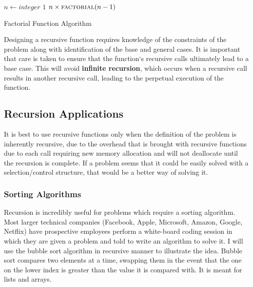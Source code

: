 \documentclass[12pt]{article}
\theoremstyle{definition}
\theoremstyle{plain}
\begin{document}
          \begin{algorithm}[H]
            \begin{algorithmic}[1]
               
               
              \Statex
              \GVariables
                  \State $n\gets integer$
              \EndGVariables
              \Statex
               
                 
                  \State \Return $1$
                 
                  \State \Return $n\times \text{\Call{factorial}{$n-1$}}$
                \EndIf
              \EndProcedure
            \end{algorithmic}
            \caption{Factorial Function Algorithm}
          \end{algorithm}

        Designing a recursive function requires knowledge of the constraints
          of the problem along with identification of the base and general
          cases. It is important that care is taken to ensure that the
          function`s recursive calls ultimately lead to a base case. This will
          avoid \textbf{infinite recursion}, which occurs when a recursive call
          results in another recursive call, leading to the perpetual execution
          of the function.

      \subsection{Recursion Applications}
        It is best to use recursive functions only when the definition of the
          problem is inherently recursive, due to the overhead that is brought
          with recursive functions due to each call requiring new memory
          allocation and will not deallocate until the recursion is complete. If
          a problem seems that it could be easily solved with a
          selection/control structure, that would be a better way of solving it.
        \subsubsection{Sorting Algorithms}
          Recursion is incredibly useful for problems which require a sorting
            algorithm. Most larger technical companies (Facebook, Apple,
            Microsoft, Amazon, Google, Netflix) have prospective employees
            perform a white-board coding session in which they are given a
            problem and told to write an algorithm to solve it. I will use the
            bubble sort algorithm in recursive manner to illustrate the
            idea. Bubble sort compares two elements at a time, swapping them in
            the event that the one on the lower index is greater than the value
            it is compared with. It is meant for lists and arrays.
          
\end{document}
